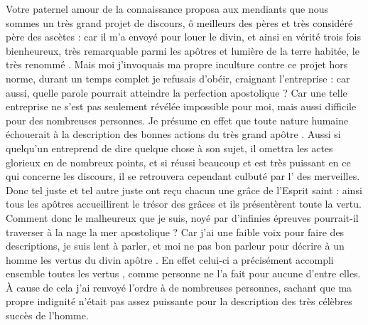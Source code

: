 


\pstart
{}
\pend
\pstart
Votre  paternel amour de la connaissance proposa aux mendiants que nous  sommes un très grand projet de discours, 
ô meilleurs des pères et très considéré père des ascètes : 
car il m'a envoyé pour louer le divin,
et  ainsi en vérité trois fois bienheureux, %
très remarquable  parmi les apôtres et lumière de la terre habitée, le très renommé .
Mais moi j'invoquais ma propre  inculture  contre  ce projet hors norme, durant un temps complet je refusais d'obéir,
craignant l'entreprise :
car aussi, quelle parole pourrait atteindre la perfection apostolique ?
Car une telle entreprise ne s'est pas seulement révélée impossible pour moi, mais aussi difficile pour des nombreuses personnes. 
Je présume en effet que toute nature humaine échouerait à la description des bonnes actions du très grand apôtre .
Aussi si quelqu'un entreprend de dire quelque chose à son sujet, il omettra les actes glorieux en de nombreux points, et si  réussi beaucoup et est très puissant en ce qui concerne les discours, il se retrouvera cependant culbuté par l' des merveilles.
Donc tel juste et tel autre juste ont reçu chacun une grâce de l'Esprit saint :
ainsi tous les apôtres accueillirent le trésor des grâces et ils  présentèrent toute la  vertu. %
Comment donc le malheureux que je suis, noyé par d'infinies épreuves %
pourrait-il traverser à la nage la mer apostolique ? 
Car j'ai une faible voix pour faire des descriptions, je suis lent à parler, et moi  ne  pas  bon parleur pour décrire à un homme les vertus du divin apôtre . 
En effet celui-ci a précisément  accompli ensemble toutes les vertus  , comme personne ne l'a fait pour aucune d'entre elles.
À cause de cela j'ai renvoyé l'ordre à de nombreuses personnes, sachant que ma propre indignité n'était pas assez puissante pour la description des  très célèbres succès de l'homme.%

